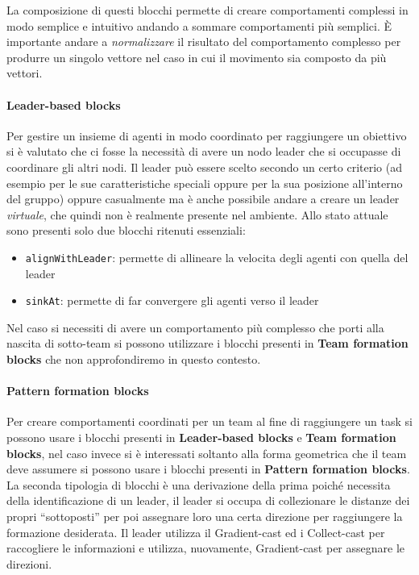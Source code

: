 \documentclass[12pt,a4paper,openright,twoside]{book}
\begin{document}
La composizione di questi blocchi permette di creare comportamenti complessi in modo semplice e intuitivo andando a sommare comportamenti più semplici. È importante andare a \textit{normalizzare} il risultato del comportamento complesso per produrre un singolo vettore nel caso in cui il movimento sia composto da più vettori.

\paragraph{Leader-based blocks} Per gestire un insieme di agenti in modo coordinato per raggiungere un obiettivo si è valutato che ci fosse la necessità di avere un nodo leader che si occupasse di coordinare gli altri nodi. Il leader può essere scelto secondo un certo criterio (ad esempio per le sue caratteristiche speciali oppure per la sua posizione all'interno del gruppo) oppure casualmente ma è anche possibile andare a creare un leader \textit{virtuale}, che quindi non è realmente presente nel ambiente. Allo stato attuale sono presenti solo due blocchi ritenuti essenziali:
\begin{itemize}
    \item \verb|alignWithLeader|: permette di allineare la velocita degli agenti con quella del leader
    \item \verb|sinkAt|: permette di far convergere gli agenti verso il leader
\end{itemize} 

Nel caso si necessiti di avere un comportamento più complesso che porti alla nascita di sotto-team si possono utilizzare i blocchi presenti in \textbf{Team formation blocks} che non approfondiremo in questo contesto.

\paragraph{Pattern formation blocks}
Per creare comportamenti coordinati per un team al fine di raggiungere un task si possono usare i blocchi presenti in \textbf{Leader-based blocks} e \textbf{Team formation blocks}, nel caso invece si è interessati soltanto alla forma geometrica che il team deve assumere si possono usare i blocchi presenti in \textbf{Pattern formation blocks}. La seconda tipologia di blocchi è una derivazione della prima poiché necessita della identificazione di un leader, il leader si occupa di collezionare le distanze dei propri ``sottoposti'' per poi assegnare loro una certa direzione per raggiungere la formazione desiderata. Il leader utilizza il Gradient-cast ed i Collect-cast per raccogliere le informazioni e utilizza, nuovamente, Gradient-cast per assegnare le direzioni.
\end{document}
